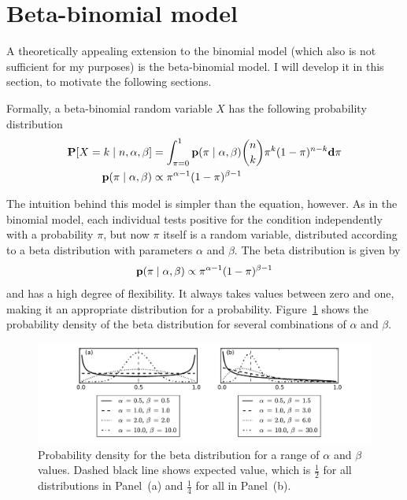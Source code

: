 \section{Beta-binomial model}
\label{beta-binomial-model}
A theoretically appealing extension to the binomial model (which also
is not sufficient for my purposes) is the beta-binomial model.  I will
develop it in this section, to motivate the following sections.

Formally, a beta-binomial random variable $X$ has the following
probability distribution
\begin{align*}
\mathbf{P}[X = k\;|\; n, \alpha, \beta]  &= \int_{\pi=0}^1 \mathbf{p}(\pi\;|\; \alpha, \beta) \binom{n}{k}\pi^k(1-\pi)^{n-k} \mathbf{d}\pi\\
\mathbf{p}(\pi\;|\; \alpha, \beta) &\propto \pi^{\alpha-1}(1-\pi)^{\beta-1}
\end{align*}

The intuition behind this model is simpler than the equation,
however. As in the binomial model, each individual tests positive for
the condition independently with a probability $\pi$, but now $\pi$
itself is a random variable, distributed according to a beta
distribution with parameters $\alpha$ and $\beta$. The beta
distribution is given by 
\[
\mathbf{p}(\pi\;|\; \alpha, \beta)
\propto \pi^{\alpha-1}(1-\pi)^{\beta-1}
\]
and has a high degree of flexibility.  It always takes values
between zero and one, making it an appropriate distribution for a
probability.  Figure~\ref{rate-model-beta} shows the probability
density of the beta distribution for several combinations of $\alpha$
and $\beta$.
\begin{figure}[ht]
\begin{center}
\includegraphics[width=\textwidth]{beta-distribution.pdf}
\end{center}
\caption{Probability density for the beta distribution for a range of
  $\alpha$ and $\beta$ values. Dashed black line shows expected value,
  which is $\frac{1}{2}$ for all distributions in Panel~(a) and
  $\frac{1}{4}$ for all in Panel~(b).}
\label{rate-model-beta}
\end{figure}

